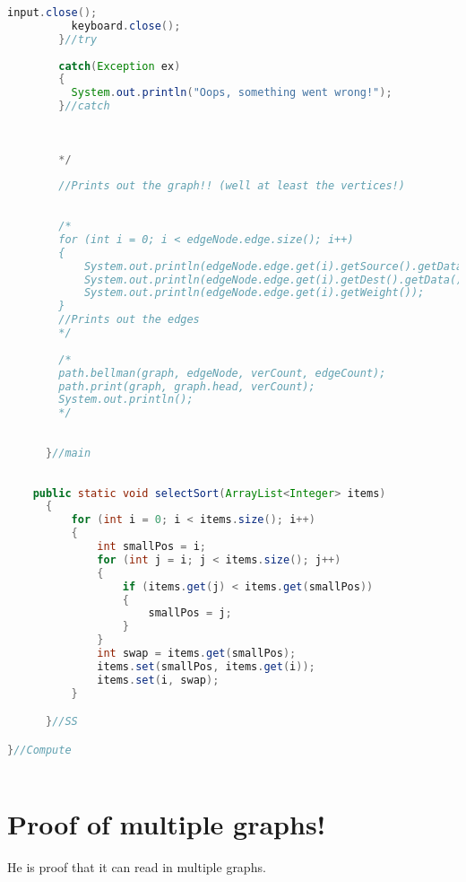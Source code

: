 \documentclass[letterpaper, 10pt]{article}
\begin{document}
\begin{lstlisting}[language = java]
	      input.close();
	      keyboard.close();
	    }//try
	    
	    catch(Exception ex)
	    {
	      System.out.println("Oops, something went wrong!");
	    }//catch
	    
	    
	    
	    */
	    
	    //Prints out the graph!! (well at least the vertices!)
	    
	    
	    /*
	    for (int i = 0; i < edgeNode.edge.size(); i++)
	    {
	    	System.out.println(edgeNode.edge.get(i).getSource().getData());
	    	System.out.println(edgeNode.edge.get(i).getDest().getData());
	    	System.out.println(edgeNode.edge.get(i).getWeight());
	    }
	    //Prints out the edges
	    */
	    
	    /*
	    path.bellman(graph, edgeNode, verCount, edgeCount);
	    path.print(graph, graph.head, verCount);
	    System.out.println();
	    */
	    
	    
	  }//main
	
	
	public static void selectSort(ArrayList<Integer> items)
	  {
		  for (int i = 0; i < items.size(); i++)
		  {
			  int smallPos = i;
			  for (int j = i; j < items.size(); j++)
			  {
				  if (items.get(j) < items.get(smallPos))
				  {
					  smallPos = j;
				  }
			  }
			  int swap = items.get(smallPos);
			  items.set(smallPos, items.get(i));
			  items.set(i, swap);
		  }

	  }//SS

}//Compute



\end{lstlisting}


\section{Proof of multiple graphs!}
He is proof that it can read in multiple graphs.
\end{document}
